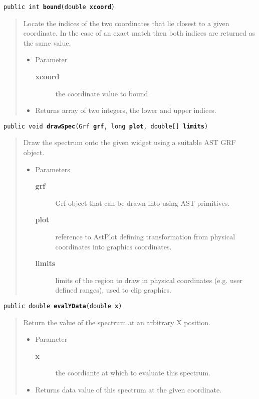 \documentclass[twoside,11pt,nolof]{starlink}
\providecommand{\method}[1]{\texttt{#1}}
\newenvironment{desc}{\begin{quote}}{\end{quote}}
\begin{document}
\method{public int \textbf{bound}(\texttt{double} \textbf{xcoord})\label{l31}\label{l32}}
\begin{desc}Locate the indices of the two coordinates that lie closest to a
 given coordinate. In the case of an exact match then both
 indices are returned as the same value.
\begin{itemize}
\item{Parameter
  \begin{description}
   \item[\textbf{xcoord}]{the coordinate value to bound.}
  \end{description}}
\end{itemize}
\begin{itemize}
\item{Returns array of two integers, the lower and upper indices. }
\end{itemize}
\end{desc}

\method{public void \textbf{drawSpec}(\texttt{Grf} \textbf{grf}, \texttt{long} \textbf{plot}, \texttt{double[]} \textbf{limits})\label{l33}\label{l34}}
\begin{desc}Draw the spectrum onto the given widget using a suitable AST
 GRF object.
\begin{itemize}
\item{Parameters
  \begin{description}
   \item[\textbf{grf}]{Grf object that can be drawn into using AST
            primitives.}
   \item[\textbf{plot}]{reference to AstPlot defining transformation from
             physical coordinates into graphics coordinates.}
   \item[\textbf{limits}]{limits of the region to draw in physical
               coordinates (e.g. user defined ranges), used to
               clip graphics.}
  \end{description}}
\end{itemize}
\end{desc}

\method{public double \textbf{evalYData}(\texttt{double} \textbf{x})\label{l35}\label{l36}}
\begin{desc}Return the value of the spectrum at an arbitrary X position.
\begin{itemize}
\item{Parameter
  \begin{description}
   \item[\textbf{x}]{the coordiante at which to evaluate this spectrum.}
  \end{description}}
\end{itemize}
\begin{itemize}
\item{Returns data value of this spectrum at the given coordinate. }
\end{itemize}
\end{desc}
\end{document}
